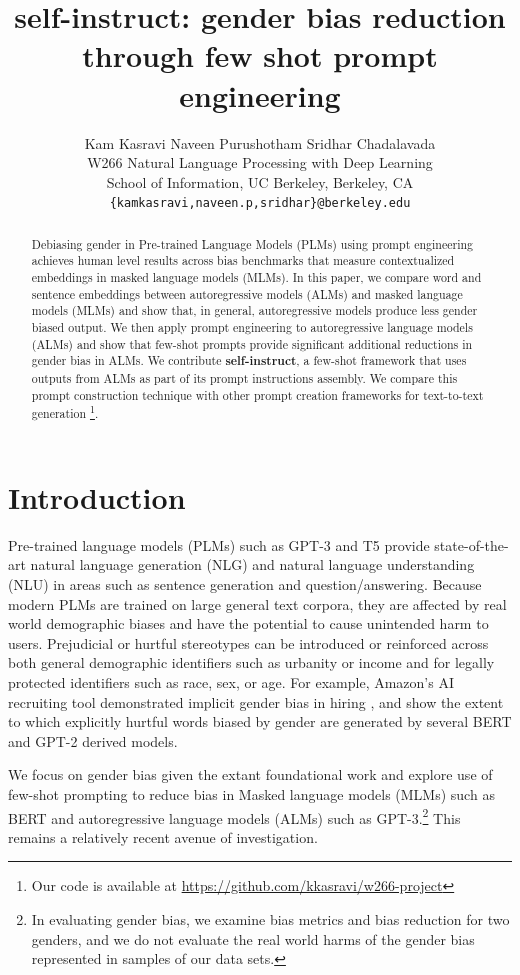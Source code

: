 \documentclass[11pt]{article}
\title{self-instruct: gender bias reduction through few shot prompt engineering}
\author{Kam Kasravi \space\space Naveen Purushotham \space\space Sridhar Chadalavada \\
  W266 Natural Language Processing with Deep Learning \\
  School of Information, UC Berkeley, Berkeley, CA  \\
	\texttt{\{kamkasravi,naveen.p,sridhar\}@berkeley.edu}}
\begin{document}
\maketitle
{}

\begin{abstract}
Debiasing gender in Pre-trained Language Models (PLMs) using prompt engineering achieves human level results across bias benchmarks that measure contextualized embeddings in masked language models (MLMs). In this paper, we compare word and sentence embeddings between autoregressive models (ALMs) and masked language models (MLMs) and show that, in general, autoregressive models produce less gender biased output. We then apply prompt engineering to autoregressive language models (ALMs) and show that few-shot prompts provide significant additional reductions in gender bias in ALMs. We contribute \textbf{self-instruct}, a few-shot framework that uses outputs from ALMs as part of its prompt instructions assembly. We compare this prompt construction technique with other prompt creation frameworks for text-to-text generation \footnote{Our code is available at \url{https://github.com/kkasravi/w266-project}}.

\end{abstract}

\section{Introduction}

Pre-trained language models (PLMs) such as GPT-3 \citep{brown2020language:20} and T5 \citep{raffel2020exploring:20} provide state-of-the-art natural language generation (NLG) and natural language understanding (NLU) in areas such as sentence generation and question/answering. Because modern PLMs are trained on large general text corpora, they are affected by real world demographic biases \citep{caliskan2022gender:22} and have the potential to cause unintended harm to users. Prejudicial or hurtful stereotypes can be introduced or reinforced across both general demographic identifiers such as urbanity or income and for legally protected identifiers such as race, sex, or age. For example, Amazon's AI recruiting tool demonstrated implicit gender bias in hiring \citep{dastin2018amazon:18}, and  \citealt{nozza2021honest:21} show the extent to which explicitly hurtful words biased by gender are generated by several BERT and GPT-2 derived models.

We focus on gender bias given the extant foundational work and explore use of few-shot prompting to reduce bias in Masked language models (MLMs) such as BERT and autoregressive language models (ALMs) such as GPT-3.\footnote{In evaluating gender bias, we examine bias metrics and bias reduction for two genders, and we do not evaluate the real world harms of the gender bias represented in samples of our data sets.} This remains a relatively recent avenue of investigation. 
\end{document}
